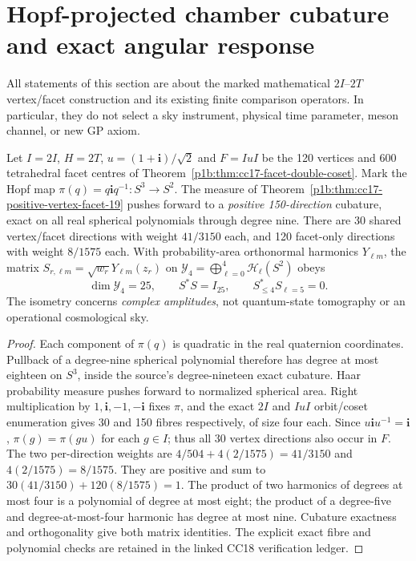 \documentclass[11pt]{article}
\begin{document}
\section{Hopf-projected chamber cubature and exact angular response}
\label{p1b:sec:cc18-hopf-chamber-response}
All statements of this section are about the marked mathematical
$2I$--$2T$ vertex/facet construction and its existing finite comparison
operators.  In particular, they do not select a sky instrument,
physical time parameter, meson channel, or new GP axiom.

\begin{theorem}
\label{p1b:thm:cc18-hopf-150-rule}
Let $I=2I$, $H=2T$, $u=(1+\mathbf i)/\sqrt2$ and $F=IuI$ be the
120 vertices and 600 tetrahedral facet centres of
Theorem~\ref{p1b:thm:cc17-facet-double-coset}.  Mark the Hopf map
$\pi(q)=q\mathbf i q^{-1}:S^3\to S^2$.
The measure of Theorem~\ref{p1b:thm:cc17-positive-vertex-facet-19}
pushes forward to a \emph{positive 150-direction} cubature, exact on
all real spherical polynomials through degree nine.  There are 30
shared vertex/facet directions with weight $41/3150$ each, and 120
facet-only directions with weight $8/1575$ each.  With probability-area
orthonormal harmonics $Y_{\ell m}$, the matrix
$S_{r,\ell m}=\sqrt{w_r}Y_{\ell m}(z_r)$ on
$\mathcal Y_4=\bigoplus_{\ell=0}^4\mathcal H_\ell(S^2)$ obeys
\[
\boxed{\dim\mathcal Y_4=25,\qquad S^*S=I_{25},\qquad
S_{\le4}^*S_{\ell=5}=0.}
\]
The isometry concerns \emph{complex amplitudes}, not quantum-state
tomography or an operational cosmological sky.
\end{theorem}
\begin{proof}
Each component of $\pi(q)$ is quadratic in the real quaternion
coordinates.  Pullback of a degree-nine spherical polynomial therefore
has degree at most eighteen on $S^3$, inside the source's degree-nineteen
exact cubature.  Haar probability measure pushes forward to normalized
spherical area.  Right multiplication by $1,\mathbf i,-1,-\mathbf i$
fixes $\pi$, and the exact $2I$ and $IuI$ orbit/coset enumeration gives
30 and 150 fibres respectively, of size four each.  Since
$u\mathbf i u^{-1}=\mathbf i$, $\pi(g)=\pi(gu)$ for each $g\in I$;
thus all 30 vertex directions also occur in $F$.  The two per-direction
weights are
$4/504+4(2/1575)=41/3150$ and $4(2/1575)=8/1575$.
They are positive and sum to $30(41/3150)+120(8/1575)=1$.
The product of two harmonics of degrees at most four is a polynomial
of degree at most eight; the product of a degree-five and degree-at-most-four
harmonic has degree at most nine.  Cubature exactness and orthogonality
give both matrix identities.  The explicit exact fibre and polynomial
checks are retained in the linked CC18 verification ledger.
\end{proof}
\end{document}
